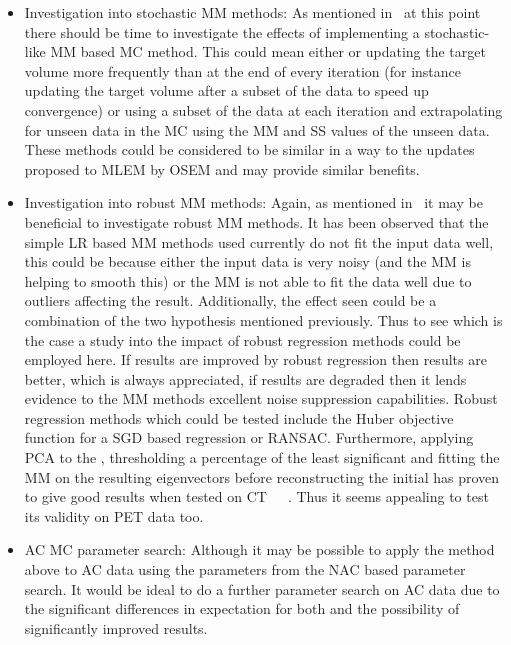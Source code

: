 \begin{itemize}
                \item Investigation into stochastic \gls{MM} methods: As mentioned in~ at this point there should be time to investigate the effects of implementing a stochastic-like \gls{MM} based \gls{MC} method. This could mean either or updating the target volume more frequently than at the end of every iteration (for instance updating the target volume after a subset of the data to speed up convergence) or using a subset of the data at each iteration and extrapolating  for unseen data in the \gls{MC} using the \gls{MM} and \gls{SS} values of the unseen data. These methods could be considered to be similar in a way to the updates proposed to \gls{MLEM} by \gls{OSEM} and may provide similar benefits.
    
                \item Investigation into robust \gls{MM} methods: Again, as mentioned in~ it may be beneficial to investigate robust \gls{MM} methods. It has been observed that the simple \gls{LR} based \gls{MM} methods used currently do not fit the input data well, this could be because either the input data is very noisy (and the \gls{MM} is helping to smooth this) or the \gls{MM} is not able to fit the data well due to outliers affecting the result. Additionally, the effect seen could be a combination of the two hypothesis mentioned previously. Thus to see which is the case a study into the impact of robust regression methods could be employed here. If results are improved by robust regression then results are better, which is always appreciated, if results are degraded then it lends evidence to the \gls{MM} methods excellent noise suppression capabilities. Robust regression methods which could be tested include the Huber objective function for a \gls{SGD} based regression or \gls{RANSAC}. Furthermore, applying \gls{PCA} to the , thresholding a percentage of the least significant  and fitting the \gls{MM} on the resulting eigenvectors before reconstructing the initial  has proven to give good results when tested on \gls{CT}~~~. Thus it seems appealing to test its validity on \gls{PET} data too.
    
                \item \gls{AC} \gls{MC} parameter search: Although it may be possible to apply the method above to \gls{AC} data using the parameters from the \gls{NAC} based parameter search. It would be ideal to do a further parameter search on \gls{AC} data due to the significant differences in expectation for both and the possibility of significantly improved results.
    

\end{itemize}
